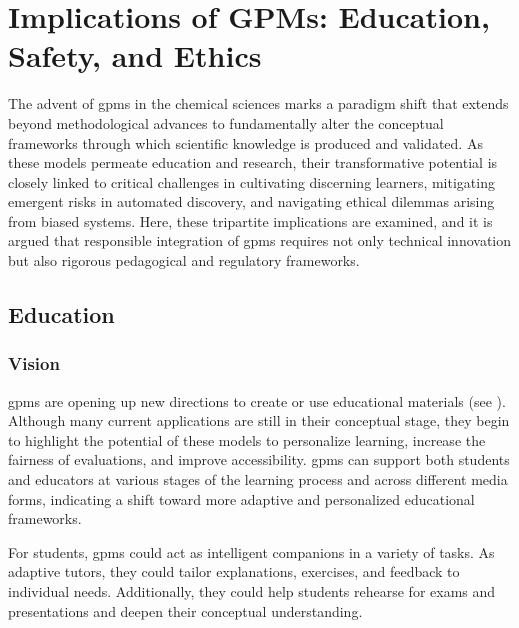 \section{Implications of GPMs: Education, Safety, and Ethics}
\label{sec:implications}

The advent of \glspl{gpm} in the chemical sciences marks a paradigm shift that extends beyond methodological advances to fundamentally alter the conceptual frameworks through which scientific knowledge is produced and validated. 
As these models permeate education and research, their transformative potential is closely linked to critical challenges in cultivating discerning learners, mitigating emergent risks in automated discovery, and navigating ethical dilemmas arising from biased systems. 
Here, these tripartite implications are examined, and it is argued that responsible integration of \glspl{gpm} requires not only technical innovation but also rigorous pedagogical and regulatory frameworks.


\subsection{Education} \label{sec:education}

\subsubsection{Vision}

\glspl{gpm} are opening up new directions to create or use educational materials (see ). 
Although many current applications are still in their conceptual stage, they begin to highlight the potential of these models to personalize learning, increase the fairness of evaluations, and improve accessibility. 
\glspl{gpm} can support both students and educators at various stages of the learning process and across different media forms, indicating a shift toward more adaptive and personalized educational frameworks. \autocite{Mollick2024}

For students, \glspl{gpm} could act as intelligent companions in a variety of tasks. 
As adaptive tutors, they could tailor explanations, exercises, and feedback to individual needs. 
Additionally, they could help students rehearse for exams and presentations and deepen their conceptual understanding. \autocite{mollick2024instructors, Sharma2025role, wang2025effect}

